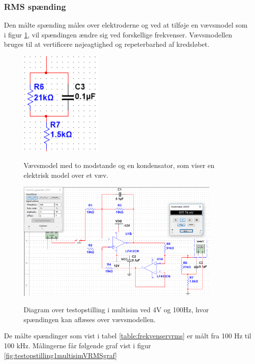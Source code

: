 \subsubsection{RMS spænding}

Den målte spænding måles over elektroderne og ved at tilføje en vævsmodel som i figur \ref{fig:testopstilling1multisimvaevs}, vil spændingen ændre sig ved forskellige frekvenser. Vævsmodellen bruges til at vertificere nøjeagtighed og repeterbarhed af kredsløbet\cite{Aroom2009}.

\begin{figure}[H]
\centering
{\includegraphics[width=4cm]
{Figure/testopstilling1multisimvaevs}}
\caption{Vævsmodel med to modstande og en kondensator, som viser en elektrisk model over et væv.}
\label{fig:testopstilling1multisimvaevs}
\end{figure}




\begin{figure}[H]
\centering
{\includegraphics[width=10cm]
{Figure/testopstilling1multisimRMS}}
\caption{Diagram over testopstilling i multisim ved 4V og 100Hz, hvor spændingen kan aflæses over vævsmodellen.}
\label{fig:testopstilling1multisimRMS}
\end{figure}

De målte spændinger som vist i tabel \ref{table:frekvenservrms} er målt fra 100 Hz til 100 kHz.  Målingerne får følgende graf vist i figur \ref{fig:testopstilling1multisimVRMSgraf} 

